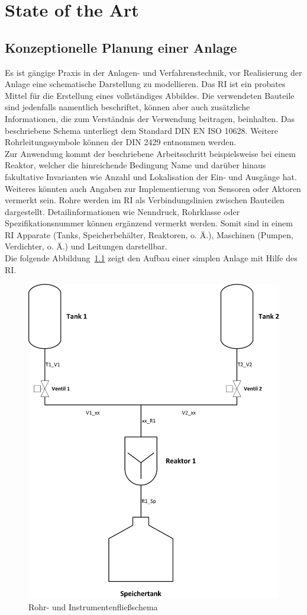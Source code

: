 
\chapter{State of the Art} \label{chapter:stateoftheart}

	\section{Konzeptionelle Planung einer Anlage}
	Es ist gängige Praxis in der Anlagen- und Verfahrenstechnik, vor Realisierung der Anlage eine schematische Darstellung zu modellieren. Das \acf{RI} ist ein probates Mittel für die Erstellung eines vollständiges Abbildes. Die verwendeten Bauteile sind jedenfalls namentlich beschriftet, können aber auch zusätzliche Informationen, die zum Verständnis der Verwendung beitragen, beinhalten. Das beschriebene Schema unterliegt dem Standard DIN EN ISO 10628. Weitere Rohrleitungssymbole können der DIN 2429 entnommen werden.\\

	Zur Anwendung kommt der beschriebene Arbeitsschritt beispielsweise bei einem Reaktor, welcher die hinreichende Bedingung \glqq Name \grqq \space und darüber hinaus fakultative Invarianten wie Anzahl und Lokalisation der Ein- und Ausgänge hat. Weiteres könnten auch Angaben zur Implementierung von Sensoren oder Aktoren vermerkt sein. Rohre werden im \ac{RI} als Verbindungslinien zwischen Bauteilen dargestellt. Detailinformationen wie Nenndruck, Rohrklasse oder Spezifikationsnummer können ergänzend vermerkt werden. Somit sind in einem \ac{RI} Apparate (Tanks, Speicherbehälter, Reaktoren, o. Ä.), Maschinen (Pumpen, Verdichter, o. Ä.) und Leitungen darstellbar.\\
	
	Die folgende Abbildung~\ref{fig:RI_SotA} zeigt den Aufbau einer simplen Anlage mit Hilfe des \ac{RI}.\\

	\begin{figure}[h!]
  		\centering
		\includegraphics[height=0.7\textwidth]{graphics/stateoftheart/RI_SotA.jpg}
		\caption{Rohr- und Instrumentenfließschema}
		\label{fig:RI_SotA}
	\end{figure}

